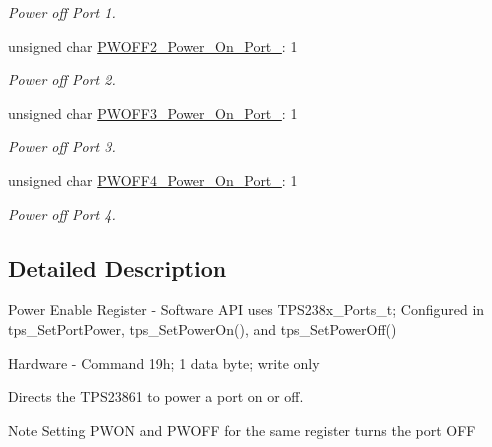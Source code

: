 \begin{DoxyCompactItemize}
\begin{DoxyCompactList}\small\item\em Power off Port 1. \end{DoxyCompactList}\item 
unsigned char \hyperlink{struct_t_p_s238x___power___enable___register__t_a8c8ece707ba3f4d255fdab02aa31a1e0}{P\-W\-O\-F\-F2\-\_\-\-Power\-\_\-\-On\-\_\-\-Port\-\_}\-: 1
\begin{DoxyCompactList}\small\item\em Power off Port 2. \end{DoxyCompactList}\item 
unsigned char \hyperlink{struct_t_p_s238x___power___enable___register__t_aa2746904655f5d6d2cb0b9250ec68170}{P\-W\-O\-F\-F3\-\_\-\-Power\-\_\-\-On\-\_\-\-Port\-\_}\-: 1
\begin{DoxyCompactList}\small\item\em Power off Port 3. \end{DoxyCompactList}\item 
unsigned char \hyperlink{struct_t_p_s238x___power___enable___register__t_a70be458ba65373c61c8ea0ad9d6b135e}{P\-W\-O\-F\-F4\-\_\-\-Power\-\_\-\-On\-\_\-\-Port\-\_}\-: 1
\begin{DoxyCompactList}\small\item\em Power off Port 4. \end{DoxyCompactList}\end{DoxyCompactItemize}


\subsection{Detailed Description}
Power Enable Register -\/ Software A\-P\-I uses T\-P\-S238x\-\_\-\-Ports\-\_\-t; Configured in tps\-\_\-\-Set\-Port\-Power, tps\-\_\-\-Set\-Power\-On(), and tps\-\_\-\-Set\-Power\-Off() \par
 Hardware -\/ Command 19h; 1 data byte; write only \par
\par
 Directs the T\-P\-S23861 to power a port on or off. \begin{DoxyNote}{Note}
Setting P\-W\-O\-N and P\-W\-O\-F\-F for the same register turns the port O\-F\-F 
\end{DoxyNote}


